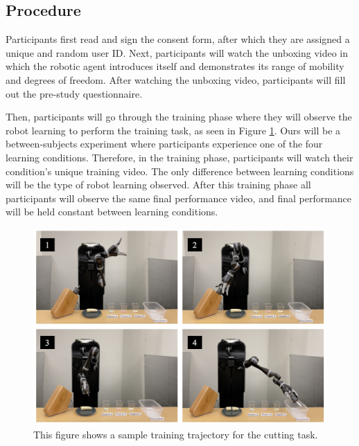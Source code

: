 \documentclass[letterpaper]{article} %
\begin{document}
\subsection{Procedure}
\label{sec:procedure}
Participants first read and sign the consent form, after which they are assigned a unique and random user ID. Next, participants will watch the unboxing video in which the robotic agent introduces itself and demonstrates its range of mobility and degrees of freedom. After watching the unboxing video, participants will fill out the pre-study questionnaire.

Then, participants will go through the training phase where they will observe the robot learning to perform the training task, as seen in Figure \ref{fig:training_flow}. Ours will be a between-subjects experiment where participants experience one of the four learning conditions. Therefore, in the training phase, participants will watch their condition's unique training video. The only difference between learning conditions will be the type of robot learning observed. After this training phase all participants will observe the same final performance video, and final performance will be held constant between learning conditions.

\begin{figure}[ht]
\centering
\includegraphics[width=1\columnwidth]{Figures/training_flow.png}
\caption{This figure shows a sample training trajectory for the cutting task.}
\label{fig:training_flow}
\end{figure}
\end{document}
